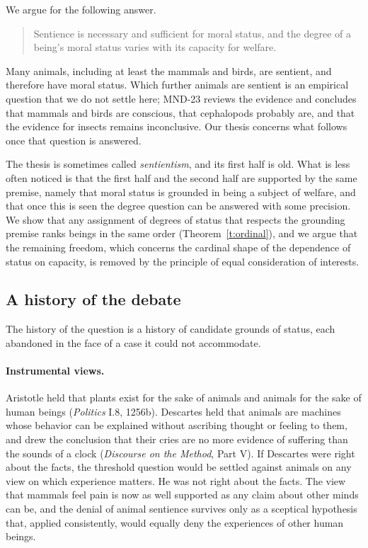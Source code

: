 \documentclass{situationist-preprint}
\begin{document}
We argue for the following answer.

\begin{quote}
Sentience is necessary and sufficient for moral status, and the degree of a being's moral status varies with its capacity for welfare.
\end{quote}

Many animals, including at least the mammals and birds, are sentient, and therefore have moral status. Which further animals are sentient is an empirical question that we do not settle here; MND-23 reviews the evidence and concludes that mammals and birds are conscious, that cephalopods probably are, and that the evidence for insects remains inconclusive. Our thesis concerns what follows once that question is answered.

The thesis is sometimes called \emph{sentientism}, and its first half is old. What is less often noticed is that the first half and the second half are supported by the same premise, namely that moral status is grounded in being a subject of welfare, and that once this is seen the degree question can be answered with some precision. We show that any assignment of degrees of status that respects the grounding premise ranks beings in the same order (Theorem~\ref{t:ordinal}), and we argue that the remaining freedom, which concerns the cardinal shape of the dependence of status on capacity, is removed by the principle of equal consideration of interests.

\subsection{A history of the debate}

The history of the question is a history of candidate grounds of status, each abandoned in the face of a case it could not accommodate.

\paragraph{Instrumental views.} Aristotle held that plants exist for the sake of animals and animals for the sake of human beings (\emph{Politics} I.8, 1256b). Descartes held that animals are machines whose behavior can be explained without ascribing thought or feeling to them, and drew the conclusion that their cries are no more evidence of suffering than the sounds of a clock (\emph{Discourse on the Method}, Part V). If Descartes were right about the facts, the threshold question would be settled against animals on any view on which experience matters. He was not right about the facts. The view that mammals feel pain is now as well supported as any claim about other minds can be, and the denial of animal sentience survives only as a sceptical hypothesis that, applied consistently, would equally deny the experiences of other human beings.
\end{document}
